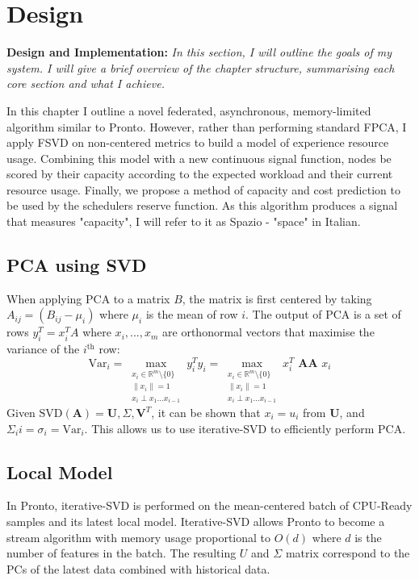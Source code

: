 \chapter{Design}
\begin{tcolorbox}[boxsep=0mm,left=2.5mm,right=2.5mm]
    \textbf{Design and Implementation:} {\em In this section, I will outline the
    goals of my system. I will give a brief overview of the chapter structure,
    summarising each core section and what I achieve.}
\end{tcolorbox}

In this chapter I outline a novel federated, asynchronous, memory-limited
algorithm similar to Pronto. However, rather than performing standard FPCA, I
apply FSVD on non-centered metrics to build a model of experience resource
usage. Combining this model with a new continuous signal function, nodes be
scored by their capacity according to the expected workload and their current
resource usage. Finally, we propose a method of capacity and cost prediction to
be used by the schedulers reserve function. As this algorithm produces a signal
that measures "capacity", I will refer to it as Spazio - "space" in Italian.

\section{PCA using SVD}
When applying PCA to a matrix $B$, the matrix is first centered by taking
$A_{ij} = (B_{ij} - \mu_i)$ where $\mu_i$ is the mean of row $i$. The output of
PCA is a set of rows $y_i^T = x_i^TA$ where $x_i,...,x_m$ are orthonormal
vectors that maximise the variance of the $i^{\text{th}}$ row:
\[ \text{Var}_i = \max_{\substack{x_i \in \mathbb{R}^m \setminus \{ 0\} \\
\|x_i\| = 1 \\ x_i \perp x_1 \ldots x_{i-1}}} y_i^T y_i = \max_{\substack{x_i
\in \mathbb{R}^m\setminus \{ 0\} \\ \|x_i\| = 1 \\ x_i \perp x_1 \ldots
x_{i-1}}} x_i^T \textbf{ AA } x_i \]
Given $\text{SVD}(\textbf{A}) = \textbf{U}, \Sigma, \textbf{V}^T$, it can be
shown that $x_i = u_i$ from $\textbf{U}$, and $\Sigma_ii = \sigma_i =
\text{Var}_i$. This allows us to use iterative-SVD to efficiently perform PCA.

\section{Local Model}
\label{sec:local-model-construction}
In Pronto, iterative-SVD is performed on the mean-centered batch of CPU-Ready
samples and its latest local model. Iterative-SVD allows Pronto to become a
stream algorithm with memory usage proportional to $O(d)$ where $d$ is the
number of features in the batch. The resulting $U$ and $\Sigma$ matrix
correspond to the PCs of the latest data combined with historical data.

